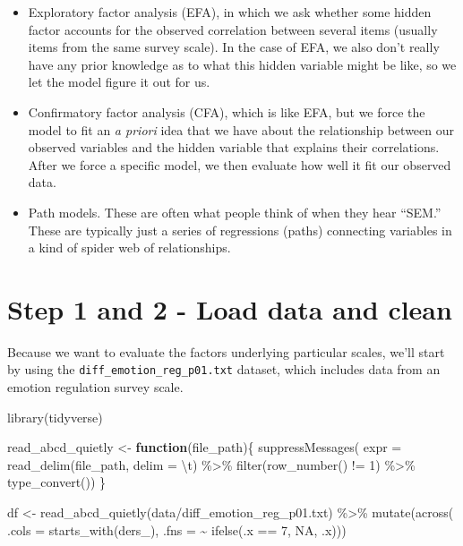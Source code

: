 \documentclass[
]{book}
\newenvironment{Shaded}{\begin{snugshade}}{\end{snugshade}}
\newcommand{\AttributeTok}[1]{\textcolor[rgb]{0.77,0.63,0.00}{#1}}
\newcommand{\ConstantTok}[1]{\textcolor[rgb]{0.00,0.00,0.00}{#1}}
\newcommand{\ControlFlowTok}[1]{\textcolor[rgb]{0.13,0.29,0.53}{\textbf{#1}}}
\newcommand{\DecValTok}[1]{\textcolor[rgb]{0.00,0.00,0.81}{#1}}
\newcommand{\FunctionTok}[1]{\textcolor[rgb]{0.00,0.00,0.00}{#1}}
\newcommand{\NormalTok}[1]{#1}
\newcommand{\OtherTok}[1]{\textcolor[rgb]{0.56,0.35,0.01}{#1}}
\newcommand{\SpecialCharTok}[1]{\textcolor[rgb]{0.00,0.00,0.00}{#1}}
\newcommand{\StringTok}[1]{\textcolor[rgb]{0.31,0.60,0.02}{#1}}
\begin{document}
\begin{itemize}
\item
  Exploratory factor analysis (EFA), in which we ask whether some hidden factor accounts for the observed correlation between several items (usually items from the same survey scale). In the case of EFA, we also don't really have any prior knowledge as to what this hidden variable might be like, so we let the model figure it out for us.
\item
  Confirmatory factor analysis (CFA), which is like EFA, but we force the model to fit an \emph{a priori} idea that we have about the relationship between our observed variables and the hidden variable that explains their correlations. After we force a specific model, we then evaluate how well it fit our observed data.
\item
  Path models. These are often what people think of when they hear ``SEM.'' These are typically just a series of regressions (paths) connecting variables in a kind of spider web of relationships.
\end{itemize}

\hypertarget{step-1-and-2---load-data-and-clean}{%
\section{Step 1 and 2 - Load data and clean}\label{step-1-and-2---load-data-and-clean}}

Because we want to evaluate the factors underlying particular scales, we'll start by using the \texttt{diff\_emotion\_reg\_p01.txt} dataset, which includes data from an emotion regulation survey scale.

\begin{Shaded}
\begin{Highlighting}[]
\FunctionTok{library}\NormalTok{(tidyverse)}

\NormalTok{read\_abcd\_quietly }\OtherTok{\textless{}{-}} \ControlFlowTok{function}\NormalTok{(file\_path)\{}
  \FunctionTok{suppressMessages}\NormalTok{(}
    \AttributeTok{expr =} \FunctionTok{read\_delim}\NormalTok{(file\_path, }\AttributeTok{delim =} \StringTok{\textquotesingle{}}\SpecialCharTok{\textbackslash{}t}\StringTok{\textquotesingle{}}\NormalTok{) }\SpecialCharTok{\%\textgreater{}\%} 
      \FunctionTok{filter}\NormalTok{(}\FunctionTok{row\_number}\NormalTok{() }\SpecialCharTok{!=} \DecValTok{1}\NormalTok{) }\SpecialCharTok{\%\textgreater{}\%} 
      \FunctionTok{type\_convert}\NormalTok{())}
\NormalTok{\}}

\NormalTok{df }\OtherTok{\textless{}{-}} \FunctionTok{read\_abcd\_quietly}\NormalTok{(}\StringTok{\textquotesingle{}data/diff\_emotion\_reg\_p01.txt\textquotesingle{}}\NormalTok{) }\SpecialCharTok{\%\textgreater{}\%} 
  \FunctionTok{mutate}\NormalTok{(}\FunctionTok{across}\NormalTok{(}
    \AttributeTok{.cols =} \FunctionTok{starts\_with}\NormalTok{(}\StringTok{\textquotesingle{}ders\_\textquotesingle{}}\NormalTok{), }
    \AttributeTok{.fns =} \SpecialCharTok{\textasciitilde{}} \FunctionTok{ifelse}\NormalTok{(.x }\SpecialCharTok{==} \DecValTok{7}\NormalTok{, }\ConstantTok{NA}\NormalTok{, .x)))}
\end{Highlighting}
\end{Shaded}
\end{document}
